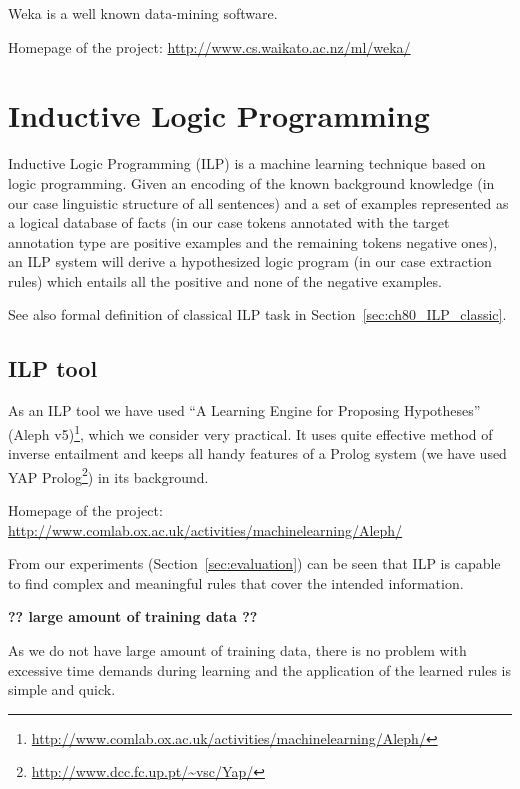 Weka \cite{biblio:Weka} is a well known data-mining software.

Homepage of the project: \url{http://www.cs.waikato.ac.nz/ml/weka/}


\section{Inductive Logic Programming}
Inductive Logic Programming (ILP) \citep{biblio:MuggletonILP} is a machine learning technique based on logic programming. Given an encoding of the known background knowledge (in our case linguistic structure of all sentences) and a set of examples represented as a logical database of facts (in our case tokens annotated with the target annotation type are positive examples and the remaining tokens negative ones), an ILP system will derive a hypothesized logic program (in our case extraction rules) which entails all the positive and none of the negative examples.

See also formal definition of classical ILP task in Section~\ref{sec:ch80_ILP_classic}.

\subsection{ILP tool}
As an ILP tool we have used ``A Learning Engine for Proposing Hypotheses'' (Aleph v5)\footnote{\url{http://www.comlab.ox.ac.uk/activities/machinelearning/Aleph/}}, which we consider very practical. It uses quite effective method of inverse entailment \citep{biblio:InverseEntailment} and keeps all handy features of a Prolog system (we have used YAP Prolog\footnote{\url{http://www.dcc.fc.up.pt/~vsc/Yap/}}) in its background.

Homepage of the project: \url{http://www.comlab.ox.ac.uk/activities/machinelearning/Aleph/}



From our experiments (Section~\ref{sec:evaluation}) can be seen that ILP is capable to find complex and meaningful rules that cover the intended information.



\textbf{?? large amount of training data ??}

As we do not have large amount of training data, there is no problem with excessive time demands during learning and the application of the learned rules is simple and quick.



